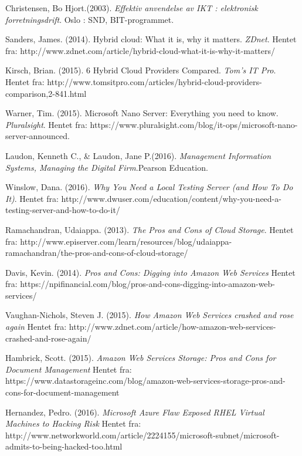 \begin{thebibliography}{999}

 Christensen, Bo Hjort.(2003). \textit{Effektiv anvendelse av IKT : elektronisk forretningsdrift}. Oslo : SND, BIT-programmet.

\bibitem{} Sanders, James. (2014). Hybrid cloud: What it is, why it matters. \textit{ZDnet}. Hentet fra: http://www.zdnet.com/article/hybrid-cloud-what-it-is-why-it-matters/

\bibitem{} Kirsch, Brian. (2015). 6 Hybrid Cloud Providers Compared. \textit{Tom's IT Pro}. Hentet fra: http://www.tomsitpro.com/articles/hybrid-cloud-providers-comparison,2-841.html

\bibitem{} Warner, Tim. (2015). Microsoft Nano Server: Everything you need to know. \textit{Pluralsight}. Hentet fra: https://www.pluralsight.com/blog/it-ops/microsoft-nano-server-announced. 

\bibitem{} Laudon, Kenneth C., \& Laudon, Jane P.(2016). \textit{Management Information Systems, Managing the Digital Firm}.Pearson Education.

\bibitem{} Winslow, Dana. (2016). \textit{Why You Need a Local Testing Server (and How To Do It)}. Hentet fra: http://www.dwuser.com/education/content/why-you-need-a-testing-server-and-how-to-do-it/

\bibitem{} Ramachandran, Udaiappa. (2013). \textit{The Pros and Cons of Cloud Storage}.
Hentet fra: http://www.episerver.com/learn/resources/blog/udaiappa-ramachandran/the-pros-and-cons-of-cloud-storage/

\bibitem{} Davis, Kevin. (2014). \textit{Pros and Cons: Digging into Amazon Web Services}
Hentet fra: https://npifinancial.com/blog/pros-and-cons-digging-into-amazon-web-services/

\bibitem{} Vaughan-Nichols, Steven J. (2015). \textit{How Amazon Web Services crashed and rose again}
Hentet fra: http://www.zdnet.com/article/how-amazon-web-services-crashed-and-rose-again/

\bibitem{} Hambrick, Scott. (2015). \textit{Amazon Web Services Storage: Pros and Cons for Document Management}
Hentet fra: https://www.datastorageinc.com/blog/amazon-web-services-storage-pros-and-cons-for-document-management

\bibitem{} Hernandez, Pedro. (2016). \textit{Microsoft Azure Flaw Exposed RHEL Virtual Machines to Hacking Risk}
Hentet fra: http://www.networkworld.com/article/2224155/microsoft-subnet/microsoft-admits-to-being-hacked-too.html


\end{thebibliography}
